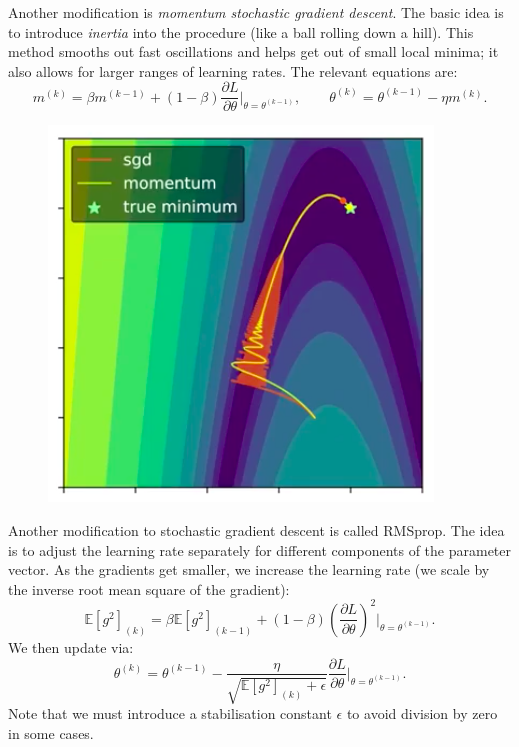 Another modification is \textit{momentum stochastic gradient descent}. The basic idea is to introduce \textit{inertia} into the procedure (like a ball rolling down a hill). This method smooths out fast oscillations and helps get out of small local minima; it also allows for larger ranges of learning rates. The relevant equations are:
\begin{equation*}
m^{(k)} = \beta m^{(k-1)} + (1-\beta) \frac{\partial L}{\partial \theta} \bigg|_{\theta = \theta^{(k-1)}}, \qquad \theta^{(k)} = \theta^{(k-1)} - \eta m^{(k)}.
\end{equation*}
\begin{figure}[H]
\centering
\includegraphics[scale=0.4]{momentumsgd.png}
\end{figure}

Another modification to stochastic gradient descent is called RMSprop. The idea is to adjust the learning rate separately for different components of the parameter vector. As the gradients get smaller, we increase the learning rate (we scale by the inverse root mean square of the gradient):
\begin{equation*}
\mathbb{E}[g^2]_{(k)} = \beta \mathbb{E}[g^2]_{(k-1)} + (1-\beta) \left( \frac{\partial L}{\partial \theta} \right)^2 \bigg|_{\theta = \theta^{(k-1)}}.
\end{equation*}
We then update via:
\begin{equation*}
\theta^{(k)} = \theta^{(k-1)} - \frac{\eta}{\sqrt{\mathbb{E}[g^2]_{(k)} + \epsilon}} \frac{\partial L}{\partial \theta}\bigg|_{\theta = \theta^{(k-1)}}. 
\end{equation*}
Note that we must introduce a stabilisation constant $\epsilon$ to avoid division by zero in some cases.\\

